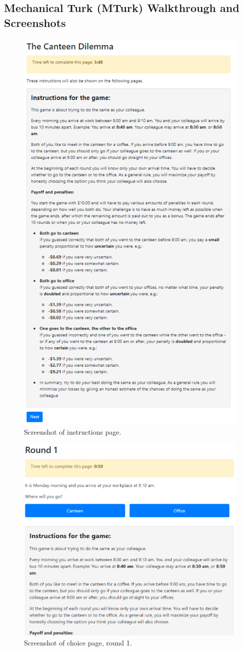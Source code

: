\documentclass[a4paper,superscriptaddress,nofootinbib]{revtex4}
\begin{document}
\subsection*{Mechanical Turk (MTurk) Walkthrough and Screenshots}
\begin{figure} %
\centering\includegraphics[width=0.8\linewidth]{screenshot_instructions}
\caption{Screenshot of instructions page.}
\label{fig:instructions}
\end{figure}
\begin{figure} %
\centering\includegraphics[width=0.8\linewidth]{screenshot_round1}
\caption{Screenshot of choice page, round 1.}
\label{fig:round1}
\end{figure}
\end{document}
